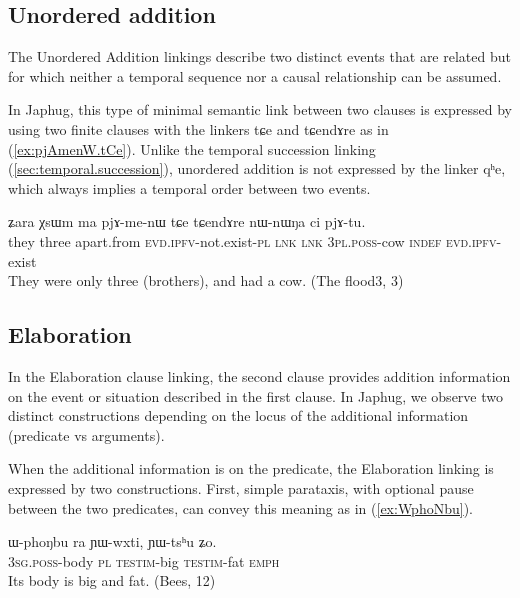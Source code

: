 \documentclass[oldfontcommands,oneside,a4paper,11pt]{article}
\newcommand{\ipa}[1]{{\phon \mbox{#1}}} %
\newcommand{\refb}[1]{(\ref{#1})}
\begin{document}
\subsection{Unordered addition} \label{sec:unordered}
The Unordered Addition linkings describe  two distinct events that are related but for which neither a temporal sequence nor a causal relationship can be assumed. 

In Japhug, this type of minimal semantic link between two clauses is expressed by using two finite clauses with the linkers \ipa{tɕe} and \ipa{tɕendɤre}  as in \refb{ex:pjAmenW.tCe}. Unlike the  temporal succession linking \refb{sec:temporal.succession}, unordered addition is not expressed by  the linker \ipa{qʰe}, which   always implies a temporal order between two events.

 \begin{exe}
\ex \label{ex:pjAmenW.tCe}
\gll
\ipa{ʑara}  	\ipa{χsɯm}  	\ipa{ma}  	\ipa{pjɤ-me-nɯ}  	\ipa{tɕe}  	\ipa{tɕendɤre}  	\ipa{nɯ-nɯŋa}  	\ipa{ci}  	\ipa{pjɤ-tu.}  \\
they three apart.from \textsc{evd.ipfv}-not.exist-\textsc{pl} \textsc{lnk} \textsc{lnk} \textsc{3pl.poss}-cow \textsc{indef} \textsc{evd.ipfv}-exist \\
\glt They were only three (brothers), and had a cow. (The flood3, 3)
\end{exe}


\subsection{Elaboration} \label{sec:elaboration}
In the Elaboration clause linking, the second clause provides addition information on the event or situation described in the first clause. In Japhug, we observe two distinct constructions depending on the locus of the additional information (predicate vs arguments).


When the additional information is on the predicate, the Elaboration linking is expressed by two constructions. First, simple parataxis, with optional pause between the two predicates, can convey this meaning as in \refb{ex:WphoNbu}.

\begin{exe}
\ex \label{ex:WphoNbu}
\gll
 \ipa{ɯ-phoŋbu}  	\ipa{ra}  	\ipa{ɲɯ-wxti,}  	\ipa{ɲɯ-tsʰu}  	\ipa{ʑo.}  \\
\textsc{ 3sg.poss}-body \textsc{pl} \textsc{testim}-big \textsc{testim}-fat \textsc{emph} \\
\glt Its body is big and fat. (Bees, 12)
\end{exe}
\end{document}
